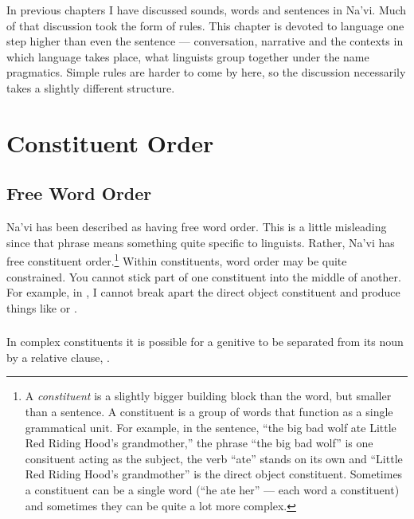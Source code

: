 
\noindent In previous chapters I have discussed sounds, words and
sentences in Na'vi.  Much of that discus\-sion took the form of rules.
This chapter is devoted to language one step higher than even the
sentence --- conversation, narrative and the contexts in which
language takes place, what linguists group together under the name
pragmatics.  Simple rules are harder to come by here, so the
discussion necessarily takes a slightly different structure.


\section{Constituent Order}

\subsection{Free Word Order} Na'vi has been described as having free
word order.  This is a little misleading since that phrase means
something quite specific to linguists.  Rather, Na'vi has free
constituent order.\footnote{A \textit{constituent} is a slightly
bigger building block than the word, but smaller than a sentence.  A
constituent is a group of words that function as a single
grammatical unit.  For example, in the sentence, ``the big bad wolf
ate Little Red Riding Hood's grandmother,'' the phrase ``the big bad
wolf'' is one consituent acting as the subject, the verb ``ate''
stands on its own and ``Little Red Riding Hood's grandmother'' is
the direct object constituent.  Sometimes a constituent can be a
single word (``he ate her'' --- each word a constituent) and
sometimes they can be quite a lot more complex.}  Within
constituents, word order may be quite constrained.  You cannot stick
part of one constituent into the middle of another.  For example, in
 ,
I cannot break apart the direct object constituent 
and produce things like  or .

\subsubsection{} In complex constituents it is possible for a genitive
to be separated from its noun by a relative clause,  .

